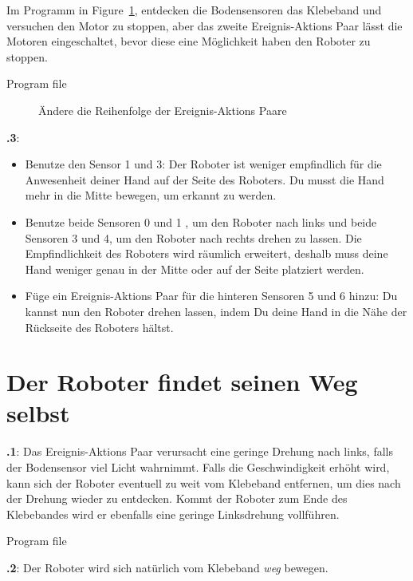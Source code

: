 \documentclass[12pt,a4paper]{article}
\begin{document}
Im Programm in Figure~\ref{fig.change}, entdecken die Bodensensoren das Klebeband und versuchen den Motor zu stoppen, aber das zweite Ereignis-Aktions Paar lässt die Motoren eingeschaltet, bevor diese eine Möglichkeit haben den Roboter zu stoppen.

{\raggedleft \hfill Program file }

\begin{figure}[hbt]
\begin{center}
\caption{Ändere die Reihenfolge der Ereignis-Aktions Paare}
\label{fig.change}
\end{center}
\end{figure}

\textbf{\thesection.3}: 
\begin{itemize}
\item Benutze den Sensor 1 und 3: Der Roboter ist weniger empfindlich für die Anwesenheit deiner Hand auf der Seite des Roboters. Du musst die Hand mehr in die Mitte bewegen, um erkannt zu werden.
\item Benutze beide Sensoren 0 und 1 , um den Roboter nach links und beide Sensoren 3 und 4, um den Roboter nach rechts drehen zu lassen. Die Empfindlichkeit des Roboters wird räumlich erweitert, deshalb muss deine Hand weniger genau in der Mitte oder auf der Seite platziert werden.
\item Füge ein Ereignis-Aktions Paar für die hinteren Sensoren 5 und 6 hinzu: Du kannst nun den Roboter drehen lassen, indem Du deine Hand in die Nähe der Rückseite des Roboters hältst.
\end{itemize}


\section{Der Roboter findet seinen Weg selbst}

\textbf{\thesection.1}:
Das Ereignis-Aktions Paar   verursacht eine geringe Drehung nach links, falls der Bodensensor viel Licht wahrnimmt. Falls die Geschwindigkeit erhöht wird, kann sich der Roboter eventuell  zu weit vom Klebeband entfernen, um dies nach der Drehung wieder zu entdecken. Kommt der Roboter zum Ende des Klebebandes wird er ebenfalls eine geringe Linksdrehung vollführen.

{\raggedleft \hfill Program file }

\textbf{\thesection.2}: 
Der Roboter wird sich natürlich vom Klebeband \emph{weg} bewegen.
\end{document}
